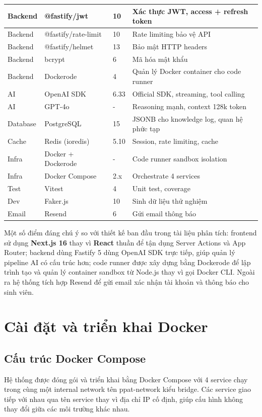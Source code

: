 \documentclass[../main.tex]{subfiles}
\begin{document}
{\begin{tabularx}{\textwidth}{|p{2.0cm}|p{4cm}|p{2.0cm}|>{\raggedright\arraybackslash}X|}
Backend & @fastify/jwt & 10 & Xác thực JWT, access + refresh token \\
\hline
Backend & @fastify/rate-limit & 10 & Rate limiting bảo vệ API \\
\hline
Backend & @fastify/helmet & 13 & Bảo mật HTTP headers \\
\hline
Backend & bcrypt & 6 & Mã hóa mật khẩu \\
\hline
Backend & Dockerode & 4 & Quản lý Docker container cho code runner \\
\hline
AI & OpenAI SDK & 6.33 & Official SDK, streaming, tool calling \\
\hline
AI & GPT-4o & - & Reasoning mạnh, context 128k token \\
\hline
Database & PostgreSQL & 15 & JSONB cho knowledge log, quan hệ phức tạp \\
\hline
Cache & Redis (ioredis) & 5.10 & Session, rate limiting, cache \\
\hline
Infra & Docker + Dockerode & - & Code runner sandbox isolation \\
\hline
Infra & Docker Compose & 2.x & Orchestrate 4 services \\
\hline
Test & Vitest & 4 & Unit test, coverage \\
\hline
Dev & Faker.js & 10 & Sinh dữ liệu thử nghiệm \\
\hline
Email & Resend & 6 & Gửi email thông báo \\
\hline
\end{tabularx}
}

Một số điểm đáng chú ý so với thiết kế ban đầu trong tài liệu phân tích: frontend sử dụng \textbf{Next.js 16} thay vì \textbf{React} thuần để tận dụng Server Actions và App Router; backend dùng Fastify 5 dùng OpenAI SDK trực tiếp, giúp quản lý pipeline AI có cấu trúc hơn; code runner được xây dựng bằng Dockerode để lập trình tạo và quản lý container sandbox từ Node.js thay vì gọi Docker CLI. Ngoài ra hệ thống tích hợp Resend để gửi email xác nhận tài khoản và thông báo cho sinh viên.

\section{Cài đặt và triển khai Docker}

\subsection{Cấu trúc Docker Compose}

Hệ thống được đóng gói và triển khai bằng Docker Compose với 4 service chạy trong cùng một internal network tên ppat-network kiểu bridge. Các service giao tiếp với nhau qua tên service thay vì địa chỉ IP cố định, giúp cấu hình không thay đổi giữa các môi trường khác nhau.
\end{document}
